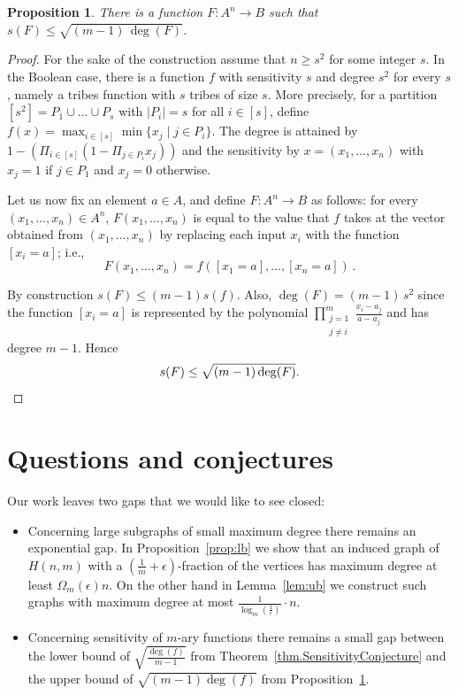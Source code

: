 \documentclass[a4paper,10pt]{amsart}
\newtheorem{prop}[thm]{Proposition}
\begin{document}
\begin{prop}\label{prop:ub}
    There is a function $F\colon A^n\rightarrow B$ such that $s(F)\leq\sqrt{(m-1)\,\deg(F)}$.
\end{prop}
\begin{proof}
    For the sake of the construction assume that $n\geq s^2$ for some integer $s$.
    In the Boolean case, there is a function $f$ with sensitivity $s$ and degree $s^2$ for every $s$, namely a tribes function with $s$ tribes of size $s$. More precisely, for a partition $[s^2]=P_1\cup\dots\cup P_s$ with $|P_i|=s$ for all $i\in[s]$, define $f(x)=\max_{i\in[s]}\min\{x_j\mid j \in P_i\}$. The degree is attained by $1-(\Pi_{i\in[s]}(1-\Pi_{j\in P_i}x_j))$ and the sensitivity by $x = (x_1,\ldots,x_n)$ with $x_j=1$ if $j \in P_1$ and $x_j=0$ otherwise. 

    Let us now fix an element $a\in A$, and define $F\colon A^n\rightarrow B$ as follows: for every $(x_1,\dots,x_n)\in A^n$, $F(x_1,\dots,x_n)$ is equal to the value that $f$ takes at the vector obtained from $(x_1,\dots,x_n)$ by replacing each input $x_i$ with the function $[x_i=a]$; i.e.,
    \[ F(x_1,\dots,x_n)=f([x_1=a],\dots,[x_n=a])\,.\]

    By construction $s(F) \leq (m-1) s(f)$. %
    Also, $\deg(F) = (m - 1)\, s^2$ since the function $[x_i=a]$ is represented by the polynomial $\prod_{\substack{j=1\\ j\neq i}}^m\frac{x_i-a_j}{a-a_j}$ and has degree $m-1$. Hence
\[
 s(F) \leq \sqrt{(m-1) \deg(F)}. \qedhere
\]\end{proof}







\section{Questions and conjectures}\label{sec:last}


Our work leaves two gaps that we would like to see closed:
\begin{itemize}
    \item Concerning large subgraphs of small maximum degree there remains an exponential gap. In Proposition~\ref{prop:lb} we show that an induced graph of $H(n,m)$ with a $(\frac{1}{m}+\epsilon)$-fraction of the vertices has maximum degree at least $\Omega_m(\epsilon) n$. On the other hand in Lemma~\ref{lem:ub} we construct such graphs with maximum degree at most $\frac{1}{\log_m(\frac{1}{\epsilon})} \cdot n$.
    \item Concerning sensitivity of $m$-ary functions there remains a small gap between the lower bound of $\sqrt{\frac{\deg(f)}{m-1}}$ from Theorem~\ref{thm.SensitivityConjecture} and the upper bound of $\sqrt{(m-1)\deg(f)}$ from Proposition~\ref{prop:ub}.
\end{itemize}
\end{document}
